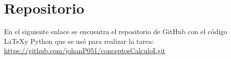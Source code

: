 \section{Repositorio}

En el siguiente enlace se encuentra el repositorio de GitHub con el código \LaTeX y Python que se usó para realizar la tarea: \url{https://github.com/johanP051/conceptosCalculoI.git}